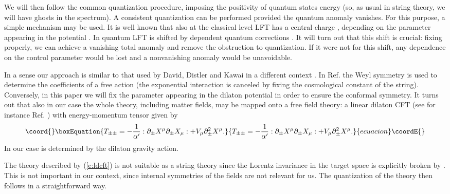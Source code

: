 \documentclass[a4paper,aps,prd,twocolumn,groupedaddress]{revtex4}
\begin{document}
We will then follow the common quantization procedure, imposing the
positivity of quantum states energy (so, as usual in string theory, we
will have ghosts in the spectrum).  A consistent quantization can be
performed provided the quantum anomaly vanishes. For this purpose, a
simple mechanism may be used. It is well known that also at the
classical level LFT has a central charge \coordHE{}, depending on the
parameter \myHighlight{$\gamma$}\coordHE{} appearing in the potential \myHighlight{$\exp(2\gamma\phi)$}\coordHE{}. In
quantum LFT \coordHE{} is shifted by \myHighlight{$\gamma$}\coordHE{} dependent quantum
corrections \cite{thorn}. It will turn out that this shift is crucial:
fixing \myHighlight{$\gamma$}\coordHE{} properly, we can achieve a vanishing total anomaly and
remove the obstruction to quantization. If it were not for this shift,
any dependence on the control parameter \myHighlight{$\gamma$}\coordHE{} would be lost and 
a nonvanishing anomaly would be unavoidable.

In a sense our approach is similar to that used by David, Distler
and Kawai in a different context \cite{kawai}. In Ref.  \cite{kawai}
the Weyl symmetry is used to determine the coefficients of a free
action (the exponential interaction is canceled by fixing the
cosmological constant of the string).  Conversely, in this paper we
will fix the parameter \myHighlight{$\gamma$}\coordHE{} appearing in the dilaton potential in
order to ensure the conformal symmetry.  It turns out that also in our
case the whole theory, including matter fields, may be mapped onto a
free field theory: a linear dilaton CFT (see for instance Ref. 
\cite{polc}) with
energy-momentum tensor given by 
\begin{equation}\coord{}\boxEquation{\label{e:ldcft}
T_{\pm \pm} = -\frac{1}{\alpha'} :\partial_\pm X^\mu \partial_\pm X_\mu: +
V_\mu\partial_\pm^2 X^\mu.
}{T_{\pm \pm} = -\frac{1}{\alpha'} :\partial_\pm X^\mu \partial_\pm X_\mu: +
V_\mu\partial_\pm^2 X^\mu.
}{ecuacion}\coordE{}\end{equation}
In our case \coordHE{} is determined by the dilaton gravity action. 

The theory described by (\ref{e:ldcft}) is not suitable as a string theory
since the Lorentz invariance in the target space is explicitly broken
by \coordHE{}. This is not important in our context, since internal
symmetries of the fields are not relevant for us.  The quantization of
the theory then follows in a straightforward way.
\end{document}
